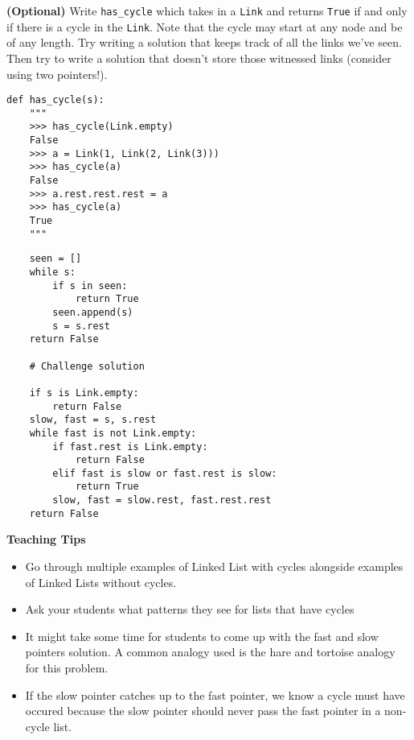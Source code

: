 \begin{blocksection}
\question \textbf{(Optional)} Write \lstinline{has_cycle} which takes in a
\lstinline{Link} and returns \lstinline{True} if and only if there is a cycle in the
\lstinline{Link}. Note that the cycle may start at any node and be of any length.
Try writing a solution that keeps track of all the links we've seen. Then try to
write a solution that doesn't store those witnessed links (consider using
two pointers!).

\begin{lstlisting}
def has_cycle(s):
    """
    >>> has_cycle(Link.empty)
    False
    >>> a = Link(1, Link(2, Link(3)))
    >>> has_cycle(a)
    False
    >>> a.rest.rest.rest = a
    >>> has_cycle(a)
    True
    """
\end{lstlisting}

\begin{solution}[3in]
\begin{lstlisting}
    seen = []
    while s:
        if s in seen:
            return True
        seen.append(s)
        s = s.rest
    return False

    # Challenge solution

    if s is Link.empty:
        return False
    slow, fast = s, s.rest
    while fast is not Link.empty:
        if fast.rest is Link.empty:
            return False
        elif fast is slow or fast.rest is slow:
            return True
        slow, fast = slow.rest, fast.rest.rest
    return False
\end{lstlisting}
\end{solution}
\end{blocksection}

\begin{questionmeta}
\textbf{Teaching Tips}
\begin{itemize}
    \item Go through multiple examples of Linked List with cycles alongside examples of Linked Lists without cycles.
    \item Ask your students what patterns they see for lists that have cycles
    \item It might take some time for students to come up with the fast and slow pointers solution. A common analogy used is the hare and tortoise analogy for this problem.
    \item If the slow pointer catches up to the fast pointer, we know a cycle must have occured because the slow pointer should never pass the fast pointer in a non-cycle list.
\end{itemize}
 \end{questionmeta}